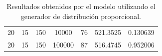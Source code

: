 \documentclass[11pt,a4paper]{report}
\begin{document}
\begin{table}[H]
{\begin{tabular}{c|c|c|c|c|c|c}
20                                                                                   & 15                                                                                     & 150                                                                        & 10000                                                                     & 76                                                                                        & 521.3525                                                                  & 0.130639              \\
20                                                                                   & 15                                                                                     & 150                                                                        & 100000                                                                    & 87                                                                                        & 516.4745                                                                  & 0.952006             
\end{tabular}%
}
\caption{Resultados obtenidos por el modelo utilizando el generador de distribución proporcional.}
\label{tabla8}
\end{table}
\end{document}
